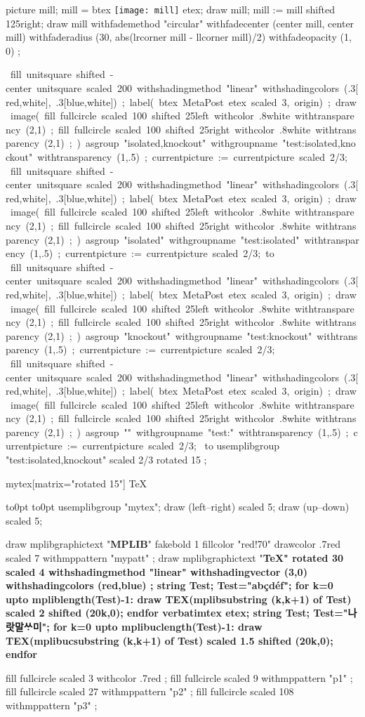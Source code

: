 \documentclass{article}
\begin{document}
\leavevmode
\mpfig
  picture mill; mill = btex \texttt{[image: mill]} etex;
  draw mill;
  mill := mill shifted 125right;
  draw mill
    withfademethod "circular"
    withfadecenter (center mill, center mill)
    withfaderadius (30, abs(lrcorner mill - llcorner mill)/2)
    withfadeopacity (1, 0)
    ;
\endmpfig

\def\test#1{%
  \mpfig
  fill unitsquare shifted -center unitsquare scaled 200
    withshadingmethod "linear"
    withshadingcolors (.3[red,white], .3[blue,white])
    ;
  label( btex MetaPost etex scaled 3, origin) ;
  draw image(
    fill fullcircle scaled 100 shifted 25left
      withcolor .8white
      withtransparency (2,1)
      ;
    fill fullcircle scaled 100 shifted 25right
      withcolor .8white
      withtransparency (2,1)
      ;
  )
  asgroup "#1"
  withgroupname "test:#1"
  withtransparency (1,.5)
  ;
  currentpicture := currentpicture scaled 2/3;
  \endmpfig
}%
\hbox{\test{isolated,knockout}\,\test{isolated}\vbox to}%
\hbox{\test{knockout}\,\test{}}%
\hbox to%
\leavevmode
\mpfig usemplibgroup "test:isolated,knockout" scaled 2/3 rotated 15 ; \endmpfig
{}%
\begin{mplibgroup}{mytex}[matrix="rotated 15"] \SuspendTagging{}\TeX \end{mplibgroup}%
%
\hbox to0pt{\hss\vrule width.5pt height5pt depth5pt\hss}%
\hbox to0pt{\hss\vrule width10pt height.25pt depth.25pt\hss}%
\tagmcend
{}%
\mpfig[actualtext=TeX] usemplibgroup "mytex"; draw (left--right) scaled 5; draw (up--down) scaled 5; \endmpfig

\mpfig[text]
  draw mplibgraphictext "\textbf{MPLIB}"
    fakebold 1 fillcolor "red!70" drawcolor .7red scaled 7
    withmppattern "mypatt" ;
\endmpfig
\mpfig[text]
  draw mplibgraphictext "\bfseries\TeX" rotated 30 scaled 4
    withshadingmethod "linear"
    withshadingvector (3,0)
    withshadingcolors (red,blue)
    ;
\endmpfig
\leavevmode
\mpfig[text]
  string Test; Test="abçdéf";
  for k=0 upto mpliblength(Test)-1:
    draw TEX(mplibsubstring (k,k+1) of Test) scaled 2 shifted (20k,0);
  endfor
\endmpfig
\qquad
{}%
\mpfig[actualtext=나랏말씀이]
  verbatimtex \hangulfont etex;
  string Test; Test="나랏말ᄊᆞ미";
  for k=0 upto mplibuclength(Test)-1:
    draw TEX(mplibucsubstring (k,k+1) of Test) scaled 1.5 shifted (20k,0);
  endfor
\endmpfig

  \mpfig[tag=false]
    fill fullcircle scaled 3
    withcolor .7red
    ;
  \endmpfig
\endmppattern
{}
  \mpfig[tag=false]
    fill fullcircle scaled 9
    withmppattern "p1"
    ;
  \endmpfig
\endmppattern
{}
  \mpfig[tag=false]
    fill fullcircle scaled 27
    withmppattern "p2"
    ;
  \endmpfig
\endmppattern
\mpfig[alt=testing nested pattern]
  fill fullcircle scaled 108
  withmppattern "p3"
  ;
\endmpfig
{}%
\end{document}
